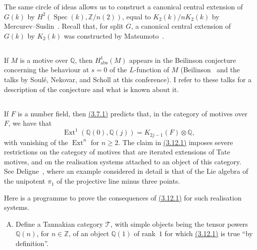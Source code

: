 \documentclass{article}
\theoremstyle{plain}
\theoremstyle{definition}
\newcommand{\scr}[1]{{\mathscr{#1}}}
\newcommand{\ZZ}{\mathbb{Z}}
\newcommand{\QQ}{\mathbb{Q}}
\newcommand{\abs}{\mathrm{abs}}
\renewcommand{\geq}{\geqslant}
\DeclareMathOperator{\Ext}{Ext}
\DeclareMathOperator{\Spec}{Spec}
\newcommand{\oldpage}[1]{\marginpar{\footnotesize$\Big\vert$ \textit{p.~#1}}}
\begin{document}
The same circle of ideas allows us to construct a canonical central extension of $G(k)$ by $H^2(\Spec(k),\ZZ/n(2))$, equal to $K_2(k)/nK_2(k)$ by Mercurev--Suslin~\cite{27}.
Recall that, for split $G$, a canonical central extension of $G(k)$ by $K_2(k)$ was constructed by Matsumoto~\cite[5.11]{25}.


\subsection{}
\label{3.11}

If $M$ is a motive over $\QQ$, then $H_\abs^1(M)$ appears in the Beilinson conjecture concerning the behaviour at $s=0$ of the $L$-function of $M$ (Beilinson~\cite{2} and the talks by Soul\'{e}, Nekovar, and Scholl at this conference).
I refer to these talks for a description of the conjecture and what is known about it.


\subsection{}
\label{3.12}

If $F$ is a number field, then \hyperref[3.7.1]{(3.7.1)} predicts that, in the category of motives over $F$, we have that
\[
\label{3.12.1}
  \Ext^1(\QQ(0),\QQ(j)) = K_{2j-1}(F)\otimes\QQ,
\tag{3.12.1}
\]
with vanishing of the $\Ext^n$ for $n\geq2$.
The claim in \hyperref[3.12.1]{(3.12.1)} imposes severe restrictions on the category of motives that are iterated extensions of Tate motives, and on the realisation systems attached to an object of this category.
See Deligne~\cite{14}, where an example considered in detail is that of the Lie algebra of the unipotent $\pi_1$ of the projective line minus three points.

\oldpage{160}
Here is a programme to prove the consequences of \hyperref[3.12.1]{(3.12.1)} for such realisation systems.
\begin{enumerate}[(A)]
  \item Define a Tannakian category $\scr{T}$, with simple objects being the tensor powers $\QQ(n)$, for $n\in\ZZ$, of an object $\QQ(1)$ of rank~$1$ for which \hyperref[3.12.1]{(3.12.1)} is true ``by definition''.
\end{enumerate}
\end{document}
